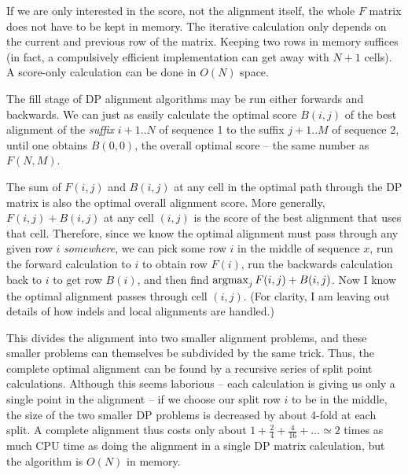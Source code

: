 \documentclass[11pt]{article}
\def\argmax{\mathop{\mathrm{argmax}}\limits}
\begin{document}
If we are only interested in the score, not the alignment itself, the
whole $F$ matrix does not have to be kept in memory. The iterative
calculation only depends on the current and previous row of the
matrix. Keeping two rows in memory suffices (in fact, a compulsively
efficient implementation can get away with $N+1$ cells). A score-only
calculation can be done in $O(N)$ space.

The fill stage of DP alignment algorithms may be run either forwards
and backwards. We can just as easily calculate the optimal score
$B(i,j)$ of the best alignment of the \emph{suffix} $i+1..N$ of
sequence 1 to the suffix $j+1..M$ of sequence 2, until one obtains
$B(0,0)$, the overall optimal score -- the same number as $F(N,M)$.

The sum of $F(i,j)$ and $B(i,j)$ at any cell in the optimal path
through the DP matrix is also the optimal overall alignment score.
More generally, $F(i,j) + B(i,j)$ at any cell $(i,j)$ is the score of
the best alignment that uses that cell. Therefore, since we know the
optimal alignment must pass through any given row $i$
\emph{somewhere}, we can pick some row $i$ in the middle of sequence
$x$, run the forward calculation to $i$ to obtain row $F(i)$, run the
backwards calculation back to $i$ to get row $B(i)$, and then find
$\argmax\nolimits_j F(i,j) + B(i,j)$. Now I know the optimal alignment
passes through cell $(i,j)$. (For clarity, I am leaving out details of
how indels and local alignments are handled.)

This divides the alignment into two smaller alignment problems, and
these smaller problems can themselves be subdivided by the same trick.
Thus, the complete optimal alignment can be found by a recursive
series of split point calculations. Although this seems laborious --
each calculation is giving us only a single point in the alignment --
if we choose our split row $i$ to be in the middle, the size of the
two smaller DP problems is decreased by about 4-fold at each split. A
complete alignment thus costs only about $1 + \frac{2}{4} +
\frac{4}{16} + \ldots \simeq 2$ times as much CPU time as doing the
alignment in a single DP matrix calculation, but the algorithm is
$O(N)$ in memory.
\end{document}
